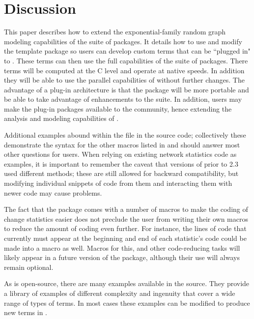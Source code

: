 \documentclass[nojss]{jss}
\begin{document}
\section*{Discussion}
This paper describes how to extend the exponential-family random graph modeling
capabilities of the  suite of packages.
It details how to use and modify the template package  so users can develop custom terms that can be ``plugged in" to . These terms can then use the full capabilities of the  suite of packages.
There terms will be computed at the C level and operate at native speeds. In
addition they will be able to use the parallel capabilities of 
without further changes. The advantage of a plug-in architecture is that the
package will be more portable and be able to take advantage of enhancements to
the  suite. In addition, users may make the plug-in packages
available to the  community, hence extending the analysis and
modeling capabilities of .

Additional examples abound within the  file in the source code; collectively these demonstrate the syntax for the other macros listed in  and should answer most other questions for users. When relying on existing network statistics code as examples, it is important to remember the caveat that versions of  prior to 2.3 used different methods; these are still allowed for backward compatibility, but modifying individual snippets of code from them and interacting them with newer code may cause problems.  

The fact that the  package comes with a number of macros to make the coding of change statistics easier does not preclude the user from writing their own macros to reduce the amount of coding even further. For instance, the lines of code that currently must appear at the beginning and end of each statistic's  code could be made into a macro as well.  Macros for this, and other code-reducing tasks will likely appear in a future version of the  package, although their use will always remain optional.

As  is open-source, there are many examples available in the source.
They provide a library of examples of different complexity and ingenuity that
cover a wide range of types of terms. In most cases these examples
can be modified to produce new terms in .
\end{document}
